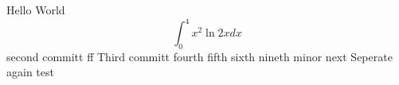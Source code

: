 \documentclass{article}
\begin{document}
Hello World
$$\int_0^4 x^2 \ln{2x}dx$$
second committ  ff
Third committ 
fourth
fifth
sixth
nineth
minor
next
Seperate
again
test
\end{document}
